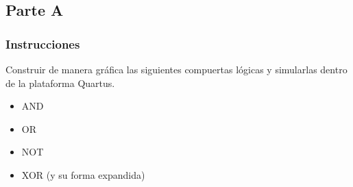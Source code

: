 \documentclass[../procedimientos.tex]{subfiles}
\begin{document}
\subsection{Parte A}
\subsubsection{Instrucciones}
\begin{em}
  Construir de manera gráfica las siguientes compuertas lógicas y simularlas 
  dentro de la plataforma Quartus.
  \begin{itemize}
      \item AND
      \item OR
      \item NOT
      \item XOR (y su forma expandida)
  \end{itemize}
\end{em}
\end{document}
